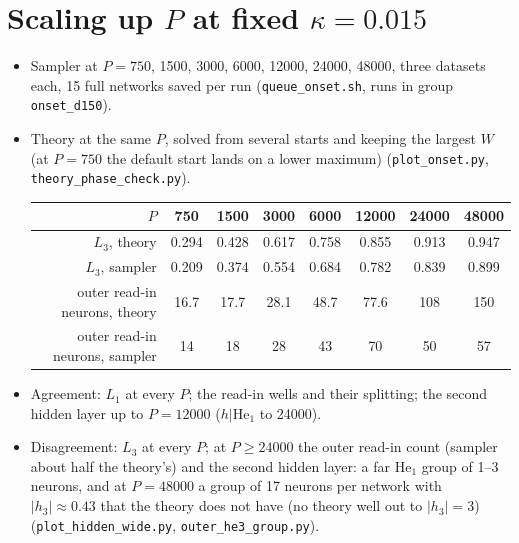 \documentclass[11pt,a4paper]{article}
\newcommand{\mworked}{\textcolor{worked}{\Large$\bm\checkmark$}}
\newcommand{\mfailed}{\textcolor{failed}{\Large$\bm\times$}}
\newcommand{\msetup}{\textcolor{neutral}{\Large$\boxtimes$}}
\newcommand{\worked}{\item[\mworked]}
\newcommand{\failed}{\item[\mfailed]}
\newcommand{\setup}{\item[\msetup]}
\begin{document}
\section*{Scaling up $P$ at fixed $\kappa=0.015$}
\begin{itemize}
\setup Sampler at $P=750$, 1500, 3000, 6000, 12000, 24000, 48000, three datasets each, 15 full networks saved per run
  (\texttt{queue\_onset.sh}, runs in group \texttt{onset\_d150}).
\worked Theory at the same $P$, solved from several starts and keeping the largest $W$ (at $P=750$ the default start
  lands on a lower maximum) (\texttt{plot\_onset.py}, \texttt{theory\_phase\_check.py}).
\begin{center}
\begin{tabular}{@{}rccccccc@{}}
\toprule
$P$ & 750 & 1500 & 3000 & 6000 & 12000 & 24000 & 48000\\
\midrule
$L_3$, theory  & 0.294 & 0.428 & 0.617 & 0.758 & 0.855 & 0.913 & 0.947\\
$L_3$, sampler & 0.209 & 0.374 & 0.554 & 0.684 & 0.782 & 0.839 & 0.899\\
outer read-in neurons, theory  & 16.7 & 17.7 & 28.1 & 48.7 & 77.6 & 108 & 150\\
outer read-in neurons, sampler & 14 & 18 & 28 & 43 & 70 & 50 & 57\\
\bottomrule
\end{tabular}
\end{center}
\worked Agreement: $L_1$ at every $P$; the read-in wells and their splitting; the second hidden layer up to $P=12000$
  ($h|\mathrm{He}_1$ to 24000).
\failed Disagreement: $L_3$ at every $P$; at $P\ge 24000$ the outer read-in count (sampler about half the theory's)
  and the second hidden layer: a far $\mathrm{He}_1$ group of 1--3 neurons, and at $P=48000$ a group of 17 neurons
  per network with $|h_3|\approx0.43$ that the theory does not have (no theory well out to $|h_3|=3$)
  (\texttt{plot\_hidden\_wide.py}, \texttt{outer\_he3\_group.py}).
\end{itemize}
\end{document}
